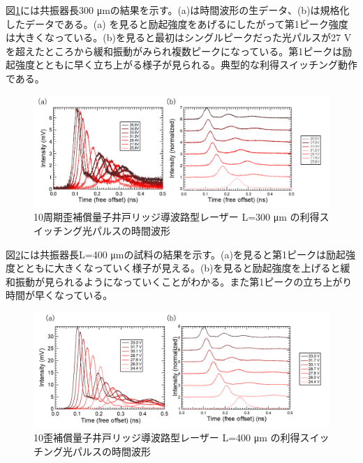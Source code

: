{図\ref{fig:fig_3_2_10QW_ridge_L300_GS}には共振器長300 \si{\micro\metre}の結果を示す。(a)は時間波形の生データ、(b)は規格化したデータである。(a) を見ると励起強度をあげるにしたがって第1ピーク強度は大きくなっている。(b)を見ると最初はシングルピークだった光パルスが27 Vを超えたところから緩和振動がみられ複数ピークになっている。第1ピークは励起強度とともに早く立ち上がる様子が見られる。典型的な利得スイッチング動作である。
\begin{figure}[h]
	\centering
	\includegraphics[width=15cm]{figure/fig_3_2_10QW_ridge_L300_GS.png}
		\caption{10周期歪補償量子井戸リッジ導波路型レーザー L=300 \si{\micro\metre} の利得スイッチング光パルスの時間波形}
		\label{fig:fig_3_2_10QW_ridge_L300_GS}
\end{figure}


図\ref{fig:fig_3_2_10QW_ridge_L400_GS}には共振器長L=400 \si{\micro\metre}の試料の結果を示す。(a)を見ると第1ピークは励起強度とともに大きくなっていく様子が見える。(b)を見ると励起強度を上げると緩和振動が見られるようになっていくことがわかる。また第1ピークの立ち上がり時間が早くなっている。
\begin{figure}[h]
	\centering
	\includegraphics[width=15cm]{figure/fig_3_2_10QW_ridge_L400_GS.png}
		\caption{10歪補償量子井戸リッジ導波路型レーザー L=400 \si{\micro\metre} の利得スイッチング光パルスの時間波形}
		\label{fig:fig_3_2_10QW_ridge_L400_GS}
\end{figure}

}
